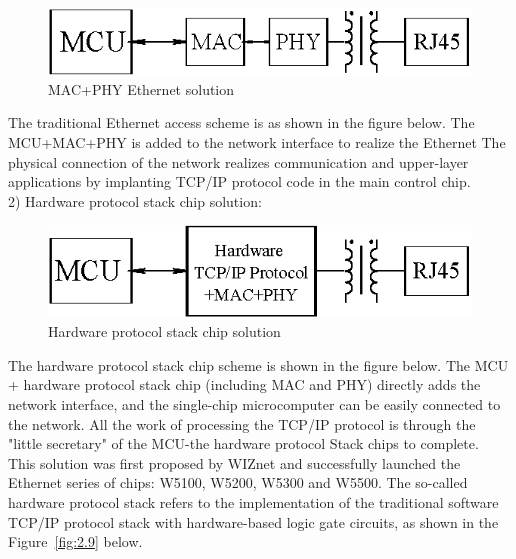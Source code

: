 \begin{figure}[!ht]
	\centering
	\includegraphics[width=15cm] {grafiken/2.7.eps}
	\caption{MAC+PHY Ethernet solution} 
	\label{fig:2.7}
\end{figure}
\FloatBarrier
The traditional Ethernet access scheme is as shown in the figure below. The MCU+MAC+PHY is added to the network interface to realize the Ethernet
The physical connection of the network realizes communication and upper-layer applications by implanting TCP/IP protocol code in the main control chip.
\\
2) Hardware protocol stack chip solution: 
\begin{figure}[!ht]
	\centering
	\includegraphics[width=15cm]{grafiken/2.8.eps}
	\caption{Hardware protocol stack chip solution} 
	\label{fig:2.8}
\end{figure}
\FloatBarrier
The hardware protocol stack chip scheme is shown in the figure below. The MCU + hardware protocol stack chip (including MAC and PHY) directly adds the network interface, and the single-chip microcomputer can be easily connected to the network. All the work of processing the TCP/IP protocol is through the "little secretary" of the MCU-the hardware protocol Stack chips to complete.
\\
This solution was first proposed by WIZnet and successfully launched the Ethernet series of chips: W5100, W5200, W5300 and W5500. The so-called hardware protocol stack refers to the implementation of the traditional software TCP/IP protocol stack with hardware-based logic gate circuits, as shown in the Figure~\ref{fig:2.9} below.

